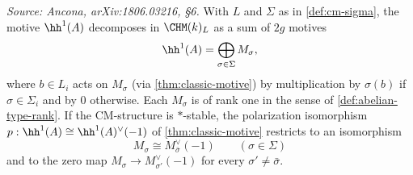\begin{proposition}[CM decomposition of \(\hh^1\)]
  \label{prop:decomposition}
  \textit{Source: Ancona, arXiv:1806.03216, §6.}
  With \(L\) and \(\Sigma\) as in \cref{def:cm-sigma}, the motive \(\hh^1(A)\)
  decomposes in \(\CHM(k)_{L}\) as a sum of \(2g\) motives
  \[\hh^1(A) = \bigoplus_{\sigma \in \Sigma} M_\sigma,\]
  where \(b \in L_i\) acts on \(M_\sigma\) (via \cref{thm:classic-motive}) by
  multiplication by \(\sigma(b)\) if \(\sigma \in \Sigma_i\) and by \(0\)
  otherwise. Each \(M_\sigma\) is of rank one in the sense of
  \cref{def:abelian-type-rank}. If the CM-structure is \(*\)-stable, the
  polarization isomorphism \(p : \hh^1(A) \cong \hh^1(A)^{\vee}(-1)\) of
  \cref{thm:classic-motive} restricts to an isomorphism
  \[M_\sigma \cong M_{\bar\sigma}^\vee(-1) \qquad (\sigma \in \Sigma)\]
  and to the zero map \(M_\sigma \to M_{\sigma'}^\vee(-1)\) for every
  \(\sigma' \neq \bar\sigma\).
\end{proposition}

